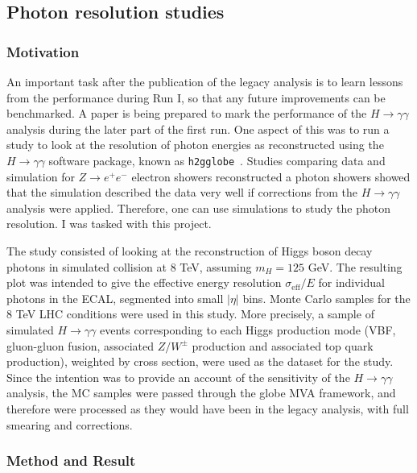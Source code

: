 \documentclass[10pt]{article}
\begin{document}
\subsection{Photon resolution studies}

\subsubsection{Motivation}

An important task after the publication of the legacy analysis is to learn lessons from the performance during Run I, so that any future improvements can be benchmarked. A paper is being prepared to mark the performance of the $H \rightarrow \gamma\gamma$ analysis during the later part of the first run. One aspect of this was to run a study to look at the resolution of photon energies as reconstructed using the $H \rightarrow \gamma\gamma$ software package, known as \texttt{h2gglobe}~\cite{globe}.
Studies comparing data and simulation for $Z\rightarrow e^+ e^-$ electron showers reconstructed a photon showers showed that the simulation described the data very well if corrections from the $H\rightarrow \gamma\gamma$ analysis were applied. Therefore, one can use simulations to study the photon resolution. I was tasked with this project.

The study consisted of looking at the reconstruction of Higgs boson decay photons in simulated collision at 8 TeV, assuming $m_H = 125$ GeV. The resulting plot was intended to give the effective energy resolution $\sigma_{\text{eff}}/E$ for individual photons in the ECAL, segmented into small $|\eta|$ bins.
Monte Carlo samples for the $8$ TeV LHC conditions were used in this study. More precisely, a sample of simulated $H \rightarrow \gamma \gamma$ events corresponding to each Higgs production mode (VBF, gluon-gluon fusion, associated $Z/W^{\pm}$ production and associated top quark production), weighted by cross section, were used as the dataset for the study.
Since the intention was to provide an account of the sensitivity of the $H \rightarrow \gamma\gamma$ analysis, the MC samples were passed through the globe MVA framework, and therefore were processed as they would have been in the legacy analysis, with full smearing and corrections.



\subsubsection{Method and Result}
\end{document}
